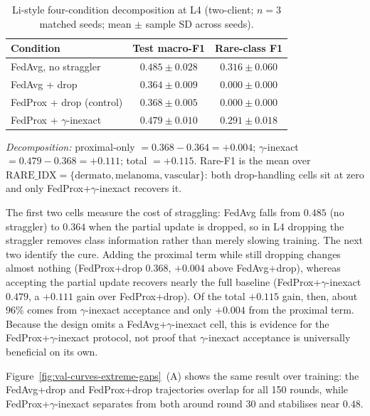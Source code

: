 \documentclass[11pt,a4paper]{report}
\begin{document}
\begin{table}[H]
\centering
\caption{Li-style four-condition decomposition at L4 (two-client; $n=3$
matched seeds; mean $\pm$ sample SD across seeds).}
\label{tab:li-decomp-l4}
\small
\begin{tabular}{lcc}
\toprule
Condition                                       & Test macro-F1                & Rare-class F1 \\
\midrule
FedAvg, no straggler                            & $0.485 \pm 0.028$            & $0.316 \pm 0.060$ \\
FedAvg + drop                                   & $0.364 \pm 0.009$            & $0.000 \pm 0.000$ \\
FedProx + drop (control)                        & $0.368 \pm 0.005$            & $0.000 \pm 0.000$ \\
FedProx + $\gamma$-inexact                      & $\mathbf{0.479 \pm 0.010}$   & $\mathbf{0.291 \pm 0.018}$ \\
\bottomrule
\end{tabular}

\smallskip
\noindent\textit{Decomposition:} proximal-only $= 0.368 - 0.364 = +0.004$;
$\gamma$-inexact $= 0.479 - 0.368 = +0.111$; total $= +0.115$. Rare-F1 is
the mean over $\mathrm{RARE\_IDX} = \{\text{dermato}, \text{melanoma},
\text{vascular}\}$: both drop-handling cells sit at zero and only
FedProx+$\gamma$-inexact recovers it.
\end{table}

The first two cells measure the cost of straggling: FedAvg falls from $0.485$
(no straggler) to $0.364$ when the partial update is dropped, so in L4 dropping
the straggler removes class information rather than merely slowing training. The
next two identify the cure. Adding the proximal term while still dropping changes
almost nothing (FedProx+drop $0.368$, $+0.004$ above FedAvg+drop), whereas
accepting the partial update recovers nearly the full baseline
(FedProx+$\gamma$-inexact $0.479$, a $+0.111$ gain over FedProx+drop). Of the
total $+0.115$ gain, then, about $96\%$ comes from $\gamma$-inexact acceptance and
only $+0.004$ from the proximal term. Because the design omits a
FedAvg+$\gamma$-inexact cell, this is evidence for the FedProx+$\gamma$-inexact
protocol, not proof that $\gamma$-inexact acceptance is universally beneficial on
its own.

Figure~\ref{fig:val-curves-extreme-gaps}~(A) shows the same result over
training: the FedAvg+drop and FedProx+drop trajectories overlap for all 150
rounds, while FedProx+$\gamma$-inexact separates from both around round 30 and
stabilises near $0.48$.
\end{document}
